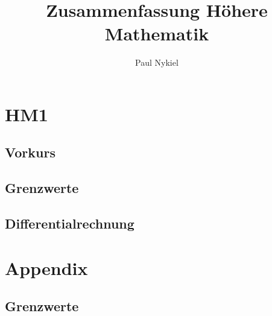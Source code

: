 \documentclass[10pt]{report}
\title{Zusammenfassung Höhere Mathematik}
\author{Paul Nykiel}
\begin{document}
    \maketitle
    \pagebreak
    \tableofcontents
    \pagebreak

    \part{HM1}
    \chapter{Vorkurs}
    

    \chapter{Grenzwerte}
    

    \chapter{Differentialrechnung}
    

    \pagebreak
    \part{Appendix}
    \chapter{Grenzwerte}
\end{document}
